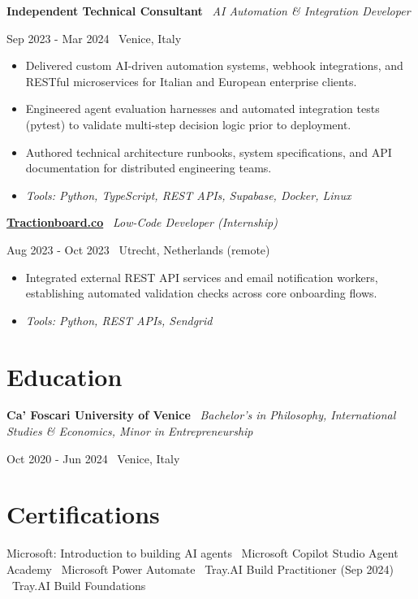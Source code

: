 \documentclass[a4paper,10pt]{article}
\newcommand{\role}[4]{%
  \vspace{2pt}\noindent
  \begin{minipage}[t]{0.70\textwidth}\raggedright\textbf{#1} \textbullet\ \textit{#3}\end{minipage}%
  \hfill
  \begin{minipage}[t]{0.28\textwidth}\raggedleft\footnotesize\color{gray}#2 \textbullet\ #4\end{minipage}%
  \vspace{1pt}%
}
\begin{document}
\role{Independent Technical Consultant}{Sep 2023 - Mar 2024}{AI Automation \& Integration Developer}{Venice, Italy}
\begin{itemize}
  \item Delivered custom AI-driven automation systems, webhook integrations, and RESTful microservices for Italian and European enterprise clients.
  \item Engineered agent evaluation harnesses and automated integration tests (pytest) to validate multi-step decision logic prior to deployment.
  \item Authored technical architecture runbooks, system specifications, and API documentation for distributed engineering teams.
  \item \textit{Tools: Python, TypeScript, REST APIs, Supabase, Docker, Linux}
\end{itemize}

\role{\href{https://tractionboard.co}{Tractionboard.co}}{Aug 2023 - Oct 2023}{Low-Code Developer (Internship)}{Utrecht, Netherlands (remote)}
\begin{itemize}
  \item Integrated external REST API services and email notification workers, establishing automated validation checks across core onboarding flows.
  \item \textit{Tools: Python, REST APIs, Sendgrid}
\end{itemize}

\section{Education}
\role{Ca' Foscari University of Venice}{Oct 2020 - Jun 2024}{Bachelor's in Philosophy, International Studies \& Economics, Minor in Entrepreneurship}{Venice, Italy}

\section{Certifications}
Microsoft: Introduction to building AI agents \textbullet\ Microsoft Copilot Studio Agent Academy \textbullet\ Microsoft Power Automate \textbullet\ Tray.AI Build Practitioner (Sep 2024) \textbullet\ Tray.AI Build Foundations

\end{document}
